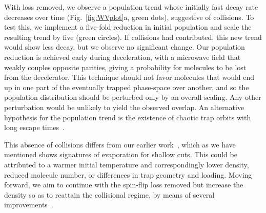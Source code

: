 \documentclass[%
 reprint,
 amsmath,amssymb,
 aps,
prl,
]{revtex4-1}
\newcommand{\cmnt}[1]{\ignorespaces}
\begin{document}
With loss removed, we observe a population trend whose initially fast decay rate decreases over time (Fig.~\ref{fig:WVplot}a, green dots), suggestive of collisions. To test this, we implement a five-fold reduction in initial population and scale the resulting trend by five (green circles). If collisions had contributed, this new trend would show less decay, but we observe no significant change. Our population reduction is achieved early during deceleration, with a microwave field that weakly couples opposite parities, giving a probability for molecules to be lost from the decelerator. This technique should not favor molecules that would end up in one part of the eventually trapped phase-space over another, and so the population distribution should be perturbed only by an overall scaling. Any other perturbation would be unlikely to yield the observed overlap. An alternative hypothesis for the population trend is the existence of chaotic trap orbits with long escape times~\cite{Gonzalez-Ferez2014}.

This absence of collisions differs from our earlier work~\cite{Stuhl2012evap}, which as we have mentioned shows signatures of evaporation for shallow cuts. This could be attributed to a warmer initial temperature and correspondingly lower density, reduced molecule number, or differences in trap geometry and loading. \cmnt{It is also possible that the spin-flip loss is playing a role even for the light evaporation cuts, although it is unclear how this could masquerade as a normalized low field density enhancement.} Moving forward, we aim to continue with the spin-flip loss removed but increase the density so as to reattain the collisional regime, by means of several improvements~\cite{Even2015,Segev2017}.

\end{document}
